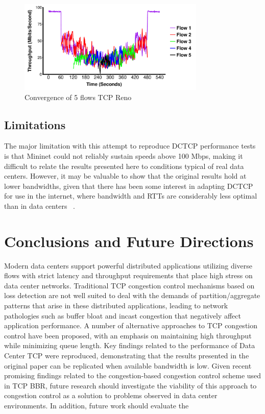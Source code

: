 \begin{figure}
\includegraphics[height=1.75in,width=3.5in]{reno_converg}
\caption{Convergence of 5 flows TCP Reno}
\end{figure}

\subsection{Limitations}

The major limitation with this attempt to reproduce DCTCP performance tests is that Mininet could not reliably sustain speeds above 100 Mbps, making it difficult to relate the results presented here to conditions typical of real data centers. However, it may be valuable to show that the original results hold at lower bandwidths, given that there has been some interest in adapting DCTCP for use in the internet, where bandwidth and RTTs are considerably less optimal than in data centers ~\cite{kuhlewind_using_2014}.

\section{Conclusions and Future Directions}

Modern data centers support powerful distributed applications utilizing diverse flows with strict latency and throughput requirements that place high stress on data center networks. Traditional TCP congestion control mechanisms based on loss detection are not well suited to deal with the demands of partition/aggregate patterns that arise in these distributed applications, leading to network pathologies such as buffer bloat and incast congestion that negatively affect application performance. A number of alternative approaches to TCP congestion control have been proposed, with an emphasis on maintaining high throughput while minimizing queue length. Key findings related to the performance of Data Center TCP were reproduced, demonstrating that the results presented in the original paper can be replicated when available bandwidth is low. Given recent promising findings related to the congestion-based congestion control scheme used in TCP BBR, future research should investigate the viability of this approach to congestion control as a solution to problems observed in data center environments. In addition, future work should evaluate the 
